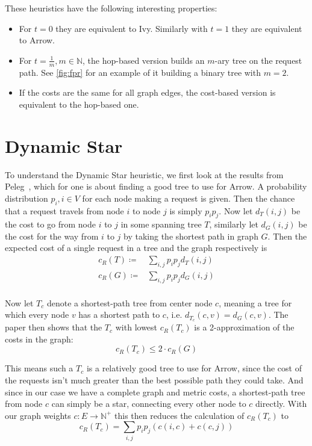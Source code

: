 \documentclass[a4paper, oneside]{discothesis}
\begin{document}
These heuristics have the following interesting properties:
\begin{itemize}
\item For $t=0$ they are equivalent to Ivy. Similarly with $t=1$ they are equivalent to Arrow.
\item For $t=\frac{1}{m}, m\in\mathbb{N}$, the hop-based version builds an $m$-ary tree on the request path. See \autoref{fig:fpr} for an example of it building a binary tree with $m=2$.
\item If the costs are the same for all graph edges, the cost-based version is equivalent to the hop-based one.
\end{itemize}

\section{Dynamic Star}
\label{alg:dynstar}

To understand the Dynamic Star heuristic, we first look at the results from Peleg~\cite{Peleg}, which for one is about finding a good tree to use for Arrow. A probability distribution $p_i, i\in V$ for each node making a request is given. Then the chance that a request travels from node $i$ to node $j$ is simply $p_ip_j$. Now let $d_T(i,j)$ be the cost to go from node $i$ to $j$ in some spanning tree $T$, similarly let $d_G(i,j)$ be the cost for the way from $i$ to $j$ by taking the shortest path in graph $G$. Then the expected cost of a single request in a tree and the graph respectively is
\begin{equation}
\begin{split}
c_R(T)\coloneqq & \sum_{i,j}p_ip_jd_T(i,j) \\
c_R(G)\coloneqq & \sum_{i,j}p_ip_jd_G(i,j) \\
\end{split}
\end{equation}

Now let $T_c$ denote a shortest-path tree from center node $c$, meaning a tree for which every node $v$ has a shortest path to $c$, i.e. $d_{T_c}(c,v)=d_G(c,v)$. The paper then shows that the $T_c$ with lowest $c_R(T_c)$ is a 2-approximation of the costs in the graph:
\begin{equation}
c_R(T_c)\leq 2\cdot c_R(G)
\end{equation}

This means such a $T_c$ is a relatively good tree to use for Arrow, since the cost of the requests isn't much greater than the best possible path they could take. And since in our case we have a complete graph and metric costs, a shortest-path tree from node $c$ can simply be a star, connecting every other node to $c$ directly. With our graph weights $c:E\to\mathbb{N}^+$ this then reduces the calculation of $c_R(T_c)$ to
\begin{equation}
\label{dynstarc}
c_R(T_c)=\sum_{i,j}p_ip_j(c(i,c)+c(c,j))
\end{equation}
\end{document}
